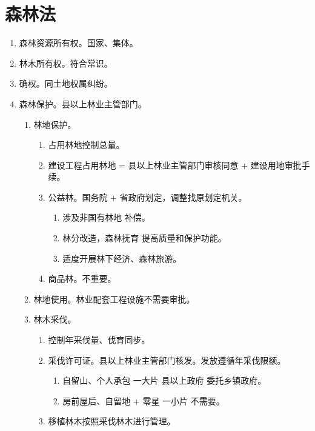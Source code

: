 \section{森林法}
\begin{enumerate}
  \item 森林资源所有权。国家、集体。
  \item 林木所有权。符合常识。
  \item 确权。同土地权属纠纷。
  \item 森林保护。县以上林业主管部门。
        \begin{enumerate}
          \item 林地保护。
                \begin{enumerate}
                  \item 占用林地控制总量。
                  \item 建设工程占用林地 = 县以上林业主管部门审核同意 + 建设用地审批手续。
                  \item 公益林。国务院 + 省政府划定，调整找原划定机关。
                        \begin{enumerate}
                          \item 涉及非国有林地 \yjt 补偿。
                          \item 林分改造，森林抚育 \yjt 提高质量和保护功能。
                          \item 适度开展林下经济、森林旅游。
                        \end{enumerate}
                  \item 商品林。不重要。
                \end{enumerate}
          \item 林地使用。林业配套工程设施不需要审批。
          \item 林木采伐。
                \begin{enumerate}
                  \item 控制年采伐量、伐育同步。
                  \item 采伐许可证。县以上林业主管部门核发。发放遵循年采伐限额。
                        \begin{enumerate}
                          \item 自留山、个人承包 \yjt 一大片 \yjt 县以上政府 \hz 委托乡镇政府。
                          \item 房前屋后、自留地 + 零星 \yjt 一小片 \yjt 不需要。
                        \end{enumerate}
                  \item 移植林木按照采伐林木进行管理。
                \end{enumerate}
        \end{enumerate}
\end{enumerate}
